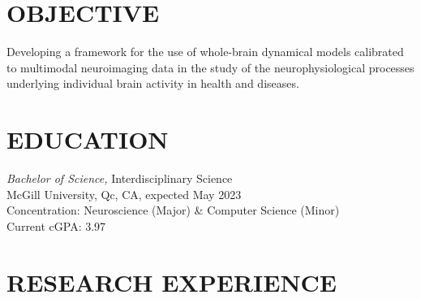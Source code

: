 \documentclass[margin, 10pt]{res} %
\begin{document}
	\begin{resume}
		
		
		\section{OBJECTIVE}  
		
		Developing a framework for the use of whole-brain dynamical models calibrated to multimodal neuroimaging data in the study of the neurophysiological processes underlying individual brain activity in health and diseases.
		
		
		\section{EDUCATION}
		
		{\sl Bachelor of Science,} Interdisciplinary Science \\
		McGill University, Qc, CA, expected May 2023 \\
		Concentration: Neuroscience (Major) \& Computer Science (Minor) \\
		Current cGPA: 3.97
		
		
		\section{RESEARCH EXPERIENCE}
		

\end{resume}
\end{document}
